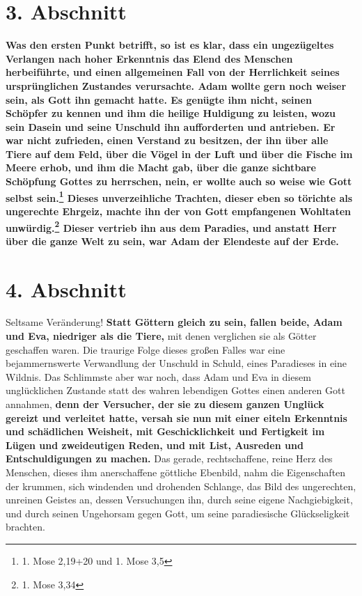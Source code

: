 \section{3. Abschnitt} \label{kap7_ab3}

\label{ref:07_03_wissen_erbsuende}
\textbf{Was den ersten Punkt betrifft, so ist es
klar, dass ein ungezügeltes Verlangen
nach hoher Erkenntnis
 das Elend des Menschen
herbeiführte, und einen allgemeinen
Fall von der Herrlichkeit seines ursprünglichen Zustandes verursachte.
   Adam
wollte gern noch weiser sein, als Gott ihn gemacht hatte. Es genügte ihm nicht,
seinen Schöpfer zu kennen und ihm die heilige Huldigung zu leisten, wozu sein
Dasein und seine Unschuld ihn aufforderten und antrieben. Er war nicht
zufrieden, einen Verstand zu besitzen, der ihn über alle
Tiere auf dem Feld,
über die Vögel in der Luft und über die Fische im Meere erhob, und ihm die Macht
gab, über die ganze sichtbare Schöpfung Gottes zu herrschen, nein, er wollte
auch so weise wie Gott selbst sein.\footnote{1. Mose 2,19+20 und 1. Mose 3,5}
Dieses unverzeihliche Trachten, dieser eben so törichte als ungerechte
Ehrgeiz, machte
ihn der von Gott empfangenen Wohltaten unwürdig.\footnote{1. Mose 3,34}
Dieser vertrieb ihn aus dem Paradies, und
anstatt Herr über die ganze Welt zu sein, war Adam der Elendeste auf der Erde.}

\section{4. Abschnitt} \label{kap7_ab4}

Seltsame Veränderung! \textbf{Statt Göttern gleich zu sein, fallen beide, Adam
und Eva, 
niedriger als die Tiere,} mit denen verglichen sie als Götter geschaffen waren.
Die traurige Folge dieses großen Falles war eine bejammernswerte Verwandlung
der Unschuld in Schuld, eines Paradieses in eine Wildnis.
Das
Schlimmste aber
war noch, dass Adam und Eva in diesem unglücklichen Zustande statt des wahren
lebendigen Gottes einen anderen Gott annahmen, \textbf{denn der
Versucher, der sie zu
diesem ganzen Unglück gereizt und verleitet hatte, versah sie nun mit einer
eiteln Erkenntnis und schädlichen
Weisheit, mit Geschicklichkeit und
Fertigkeit
im Lügen und zweideutigen Reden, und mit
List, Ausreden und Entschuldigungen zu
machen.} Das gerade, rechtschaffene, reine Herz des Menschen, dieses ihm
anerschaffene göttliche Ebenbild, nahm die Eigenschaften der krummen, sich
windenden und drohenden Schlange, das Bild des
ungerechten, unreinen Geistes an,
dessen Versuchungen ihn, durch seine eigene Nachgiebigkeit, und durch seinen
Ungehorsam gegen Gott, um seine paradiesische
Glückseligkeit brachten.

